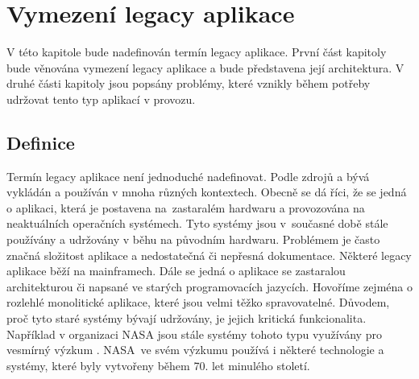 \chapter{Vymezení legacy aplikace}
V této kapitole bude nadefinován termín legacy aplikace. První část kapitoly bude věnována vymezení legacy aplikace a bude představena její architektura. V druhé části kapitoly jsou popsány problémy, které vznikly během potřeby udržovat tento typ aplikací v provozu. 

\section{Definice}
Termín legacy aplikace není jednoduché nadefinovat. Podle zdrojů \cite{legacy1} a \cite{legacy2} bývá vykládán a používán v mnoha různých kontextech. Obecně se dá říci, že se jedná o aplikaci, která je postavena na zastaralém hardwaru a provozována na neaktuálních operačních systémech. Tyto systémy jsou v současné době stále používány a udržovány v běhu na původním hardwaru. Problémem je často značná složitost aplikace a nedostatečná či nepřesná dokumentace. Některé legacy aplikace běží na mainframech. Dále se jedná o aplikace se zastaralou architekturou či napsané ve starých programovacích jazycích. Hovoříme zejména o rozlehlé monolitické aplikace, které jsou velmi těžko spravovatelné. Důvodem, proč tyto staré systémy bývají udržovány, je jejich kritická funkcionalita. Například v organizaci NASA jsou stále systémy tohoto typu využívány pro vesmírný výzkum \cite{NASA_legacy}. NASA ve svém výzkumu používá i některé technologie a systémy, které byly vytvořeny během 70. let minulého století.


